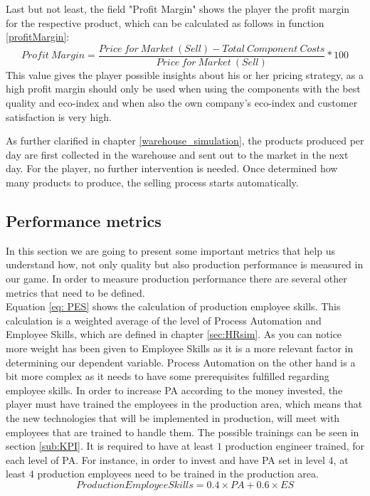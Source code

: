 Last but not least, the field "Profit Margin" shows the player the profit margin for the respective product, which can be calculated as follows in function \ref{profitMargin}:
\begin{equation}
\label{profitMargin}
    Profit~Margin = \frac{Price~for~Market~(Sell) - Total~Component ~Costs}{Price~for~Market~(Sell)} * 100
\end{equation}
This value gives the player possible insights about his or her pricing strategy, as a high profit margin should only be used when using the components with the best quality and eco-index and when also the own company's eco-index and customer satisfaction is very high.

As further clarified in chapter \ref{warehouse_simulation}, the products produced per day are first collected in the warehouse and sent out to the market in the next day. For the player, no further intervention is needed. Once determined how many products to produce, the selling process starts automatically.

\subsection{Performance metrics}
\label{sub:PM}
In this section we are going to present some important metrics that help us understand how, not only quality but also production performance is measured in our game. In order to measure production performance there are several other metrics that need to be defined. \\
Equation \ref{eq: PES} shows the calculation of production employee skills. This calculation is a weighted average of the level of Process Automation and Employee Skills, which are defined in chapter \ref{sec:HRsim}. As you can notice more weight has been given to Employee Skills as it is a more relevant factor in determining our dependent variable. Process Automation on the other hand is a bit more complex as it needs to have some prerequisites fulfilled regarding employee skills. In order to increase PA according to the money invested, the player must have trained the employees in the production area, which means that the new technologies that will be implemented in production, will meet with employees that are trained to handle them. The possible trainings can be seen in section \ref{sub:KPI}. It is required to have at least $1$ production engineer trained, for each level of PA. For instance, in order to invest and have PA set in level $4$, at least $4$ production employees need to be trained in the production area.
\begin{equation}
Production Employee Skills= 0.4\times PA + 0.6\times ES
\label{eq: PES}
\end{equation}

